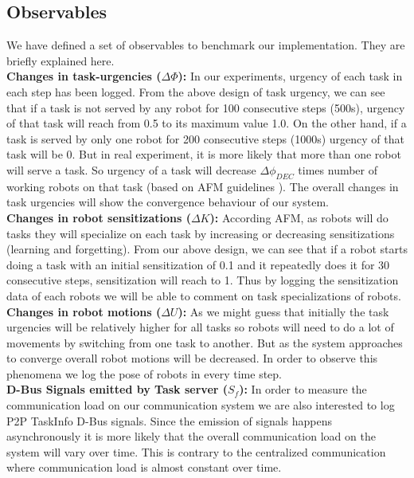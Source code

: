 \documentclass[letterpaper, 10 pt, times, conference]{ieeeconf} %
\begin{document}
\subsection{Observables}
We have defined a set of observables to benchmark our implementation. They are briefly explained here.\\
\textbf{Changes in task-urgencies ($\Delta \Phi$): }
In our experiments, urgency of each task in each step has been logged. From the above design of task urgency, we can see that if a task is not served by any robot for 100 consecutive steps (500s), urgency of that task will reach from 0.5 to its maximum value 1.0. On the other hand, if a task is served by only one robot for 200 consecutive steps (1000s) urgency of that task will be 0. But in real experiment, it is more likely that more than one robot will serve a task. So urgency of a task will decrease $\Delta\phi_{DEC}$ times number of working robots on that task (based on AFM guidelines \cite{Elsa}). The overall changes in task urgencies will show the convergence behaviour of our system.\\
\textbf{Changes in robot sensitizations ($\Delta K$): }
According AFM, as robots will do tasks they will specialize on each task by increasing or decreasing sensitizations (learning and forgetting). From our above design, we can see that if a robot starts doing a task with an initial sensitization of 0.1 and it repeatedly does it for 30 consecutive steps, sensitization will reach to 1. Thus by logging the sensitization data of each robots we will be able to comment on task specializations of robots.\\
\textbf{Changes in robot motions ($\Delta U$): }
As we might guess that initially the task urgencies will be relatively higher for all tasks so robots will need to do a lot of movements by switching from one task to another. But as the system approaches to converge overall robot motions will be decreased. In order to observe this phenomena we log the pose of robots in every time step.\\
\textbf{D-Bus Signals emitted by Task server ($S_f$):} 
In order to measure the communication load on our communication system we are also interested to log P2P TaskInfo D-Bus signals. Since the emission of signals happens asynchronously it is more likely that the overall communication load on the system will vary over time. This is contrary to the centralized communication where communication load is almost constant over time.
\end{document}
